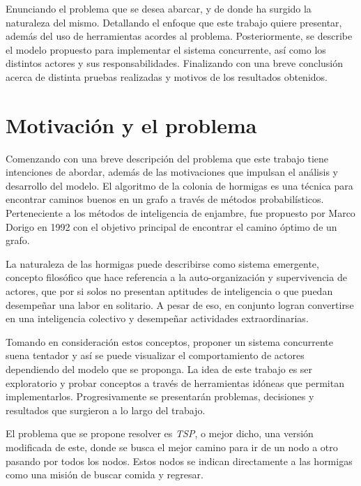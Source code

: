 \documentclass[
12pt, %
letterpaper, %
oneside, %
headinclude,footinclude, %
BCOR5mm, %
]{scrartcl}
\begin{document}
Enunciando el problema que se desea abarcar, y de donde ha surgido la naturaleza del mismo. Detallando el enfoque que este trabajo quiere presentar, además del uso de herramientas acordes al problema. Posteriormente, se describe el modelo propuesto para implementar el sistema concurrente, así como los distintos actores y sus responsabilidades. Finalizando con una breve conclusión acerca de distinta pruebas realizadas y motivos de los resultados obtenidos.

\newpage
 

\section{Motivación y el problema}

Comenzando con una breve descripción del problema que este trabajo tiene intenciones de abordar, además de las motivaciones que impulsan el análisis y desarrollo del modelo. El algoritmo de la colonia de hormigas es una técnica para encontrar caminos buenos en un grafo a través de métodos probabilísticos. Perteneciente a los métodos de inteligencia de enjambre, fue propuesto por Marco Dorigo en 1992\cite{Colorni91distributedoptimization} con el objetivo principal de encontrar el camino óptimo de un grafo.

La naturaleza de las hormigas puede describirse como sistema emergente, concepto filosófico que hace referencia a la auto-organización y supervivencia de actores, que por si solos no presentan aptitudes de inteligencia o que puedan desempeñar una labor en solitario. A pesar de eso, en conjunto logran convertirse en una inteligencia colectivo y desempeñar actividades extraordinarias.

Tomando en consideración estos conceptos, proponer un sistema concurrente suena tentador y así se puede visualizar el comportamiento de actores dependiendo del modelo que se proponga. La idea de este trabajo es ser exploratorio y probar conceptos a través de herramientas idóneas que permitan implementarlos. Progresivamente se presentarán problemas, decisiones y resultados que surgieron a lo largo del trabajo.


El problema que se propone resolver es \emph{TSP}, o mejor dicho, una versión modificada de este, donde se busca el mejor camino para ir de un nodo a otro pasando por todos los nodos. Estos nodos se indican directamente a las hormigas como una misión de buscar comida y regresar.
\end{document}
